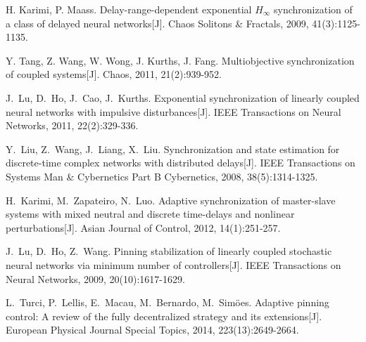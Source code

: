 \begin{thebibliography}{99}

H. Karimi, P. Maass. Delay-range-dependent exponential {$H_\infty$} synchronization of a class of delayed neural networks[J].
Chaos Solitons \& Fractals, 2009, 41(3):1125-1135.

Y. Tang, Z. Wang, W. Wong, J. Kurths, J. Fang.
 Multiobjective synchronization of coupled systems[J].
Chaos, 2011, 21(2):939-952.

J.~Lu, D.~Ho, J.~Cao, J.~Kurths.
 Exponential synchronization of linearly coupled neural networks with impulsive disturbances[J].
IEEE Transactions on Neural Networks, 2011, 22(2):329-336.

Y.~Liu, Z.~Wang, J.~Liang, X.~Liu.
 Synchronization and state estimation for discrete-time complex networks with distributed delays[J].
IEEE Transactions on Systems Man \& Cybernetics Part B
  Cybernetics, 2008, 38(5):1314-1325.

H.~Karimi, M.~Zapateiro, N.~Luo.
 Adaptive synchronization of master-slave systems with mixed neutral and discrete time-delays and nonlinear perturbations[J].
 Asian Journal of Control, 2012, 14(1):251-257.

J.~Lu, D.~Ho, Z.~Wang.
Pinning stabilization of linearly coupled stochastic neural networks via minimum number of controllers[J].
IEEE Transactions on Neural Networks, 2009, 20(10):1617-1629.

L.~Turci, P.~Lellis, E.~Macau, M.~Bernardo, M.~Sim{\"{o}}es.
 Adaptive pinning control: A review of the fully decentralized strategy and its extensions[J].
European Physical Journal Special Topics, 2014, 223(13):2649-2664.


\end{thebibliography}
